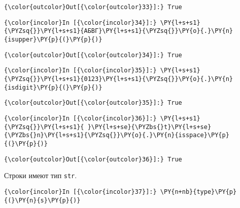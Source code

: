             \begin{Verbatim}[commandchars=\\\{\}]
{\color{outcolor}Out[{\color{outcolor}33}]:} True
\end{Verbatim}
        
    \begin{Verbatim}[commandchars=\\\{\}]
{\color{incolor}In [{\color{incolor}34}]:} \PY{l+s+s1}{\PYZsq{}}\PY{l+s+s1}{АБВГ}\PY{l+s+s1}{\PYZsq{}}\PY{o}{.}\PY{n}{isupper}\PY{p}{(}\PY{p}{)}
\end{Verbatim}

            \begin{Verbatim}[commandchars=\\\{\}]
{\color{outcolor}Out[{\color{outcolor}34}]:} True
\end{Verbatim}
        
    \begin{Verbatim}[commandchars=\\\{\}]
{\color{incolor}In [{\color{incolor}35}]:} \PY{l+s+s1}{\PYZsq{}}\PY{l+s+s1}{0123}\PY{l+s+s1}{\PYZsq{}}\PY{o}{.}\PY{n}{isdigit}\PY{p}{(}\PY{p}{)}
\end{Verbatim}

            \begin{Verbatim}[commandchars=\\\{\}]
{\color{outcolor}Out[{\color{outcolor}35}]:} True
\end{Verbatim}
        
    \begin{Verbatim}[commandchars=\\\{\}]
{\color{incolor}In [{\color{incolor}36}]:} \PY{l+s+s1}{\PYZsq{}}\PY{l+s+s1}{ }\PY{l+s+se}{\PYZbs{}t}\PY{l+s+se}{\PYZbs{}n}\PY{l+s+s1}{\PYZsq{}}\PY{o}{.}\PY{n}{isspace}\PY{p}{(}\PY{p}{)}
\end{Verbatim}

            \begin{Verbatim}[commandchars=\\\{\}]
{\color{outcolor}Out[{\color{outcolor}36}]:} True
\end{Verbatim}
        
    Строки имеют тип \texttt{str}.

    \begin{Verbatim}[commandchars=\\\{\}]
{\color{incolor}In [{\color{incolor}37}]:} \PY{n+nb}{type}\PY{p}{(}\PY{n}{s}\PY{p}{)}
\end{Verbatim}


